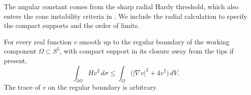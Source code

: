 The angular constant comes from the sharp radial Hardy threshold,
which also enters the cone instability criteria in
\cite[Propositions~2.1--2.2]{JerisonSavin2015}. We include the radial
calculation to specify the compact supports and the order of limits.

\begin{corollary}\label{geo:spherical-stability}
For every real function $v$ smooth up to the regular boundary of the
working component $\Omega\subset S^5$, with compact support in its
closure away from the tips if present,
\begin{equation}\label{geo:spherical-inequality}
 \int_{\partial\Omega}H v^2\,d\sigma
 \le \int_\Omega\bigl(|\nabla v|^2+4v^2\bigr)\,dV.
\end{equation}
The trace of $v$ on the regular boundary is arbitrary.
\end{corollary}

